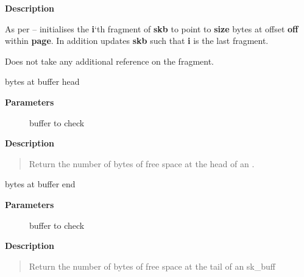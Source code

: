 \documentclass[a4paper,8pt,english]{sphinxmanual}
\begin{document}
\textbf{Description}

As per {\hyperref[networking/kapi:c.__skb_fill_page_desc]{\emph{}}} -- initialises the \textbf{i}`th fragment of
\textbf{skb} to point to \textbf{size} bytes at offset \textbf{off} within \textbf{page}. In
addition updates \textbf{skb} such that \textbf{i} is the last fragment.

Does not take any additional reference on the fragment.

\begin{fulllineitems}
\label{networking/kapi:c.skb_headroom}
bytes at buffer head

\end{fulllineitems}


\textbf{Parameters}
\begin{description}
\item[{}] \leavevmode
buffer to check

\end{description}

\textbf{Description}
\begin{quote}

Return the number of bytes of free space at the head of an {\hyperref[networking/kapi:c.sk_buff]{\emph{}}}.
\end{quote}

\begin{fulllineitems}
\label{networking/kapi:c.skb_tailroom}
bytes at buffer end

\end{fulllineitems}


\textbf{Parameters}
\begin{description}
\item[{}] \leavevmode
buffer to check

\end{description}

\textbf{Description}
\begin{quote}

Return the number of bytes of free space at the tail of an sk\_buff
\end{quote}
\end{document}
